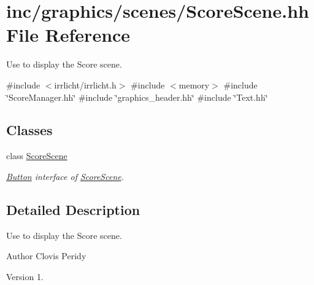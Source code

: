 \hypertarget{ScoreScene_8hh}{}\section{inc/graphics/scenes/\+Score\+Scene.hh File Reference}
\label{ScoreScene_8hh}


Use to display the Score scene.  


{\ttfamily \#include $<$irrlicht/irrlicht.\+h$>$}\newline
{\ttfamily \#include $<$memory$>$}\newline
{\ttfamily \#include \char`\"{}Score\+Manager.\+hh\char`\"{}}\newline
{\ttfamily \#include \char`\"{}graphics\+\_\+header.\+hh\char`\"{}}\newline
{\ttfamily \#include \char`\"{}Text.\+hh\char`\"{}}\newline
\subsection*{Classes}
\begin{DoxyCompactItemize}
\item 
class \hyperlink{classScoreScene}{Score\+Scene}
\begin{DoxyCompactList}\small\item\em \hyperlink{classButton}{Button} interface of \hyperlink{classScoreScene}{Score\+Scene}. \end{DoxyCompactList}\end{DoxyCompactItemize}


\subsection{Detailed Description}
Use to display the Score scene. 

\begin{DoxyAuthor}{Author}
Clovis Peridy 
\end{DoxyAuthor}
\begin{DoxyVersion}{Version}
1. 
\end{DoxyVersion}
